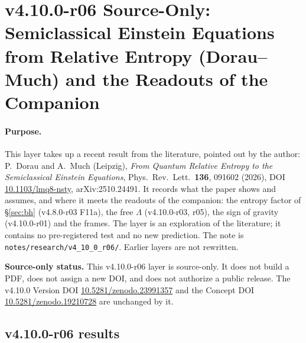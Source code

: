 \clearpage
\section*{v4.10.0-r06 Source-Only: Semiclassical Einstein Equations from Relative Entropy (Dorau--Much) and the Readouts of the Companion}
\label{sec:v4100-r06-relative-entropy}

\paragraph{Purpose.}
This layer takes up a recent result from the literature, pointed out by the author: P.~Dorau and A.~Much (Leipzig), \emph{From Quantum
Relative Entropy to the Semiclassical Einstein Equations}, Phys.\ Rev.\ Lett.\ \textbf{136}, 091602 (2026), DOI
\href{https://doi.org/10.1103/lmq8-nsty}{10.1103/lmq8-nsty}, arXiv:2510.24491.  It records what the paper shows and assumes, and where it meets the
readouts of the companion: the entropy factor of \S\ref{sec:bh} (v4.8.0-r03 F11a), the free \(\Lambda\) (v4.10.0-r03, r05), the sign of gravity
(v4.10.0-r01) and the frames.  The layer is an exploration of the literature; it contains no pre-registered test and no new prediction.
The note is \texttt{notes/\allowbreak research/\allowbreak v4\_10\_0\_r06/}.  Earlier layers are not rewritten.

\noindent\textbf{Source-only status.}
This v4.10.0-r06 layer is source-only.  It does not build a PDF, does not assign a new DOI,
and does not authorize a public release.  The v4.10.0 Version DOI
\href{https://doi.org/10.5281/zenodo.23991357}{10.5281/zenodo.23991357} and the Concept DOI
\href{https://doi.org/10.5281/zenodo.19210728}{10.5281/zenodo.19210728} are unchanged by it.

\subsection*{v4.10.0-r06 results}
\label{subsec:v4100-r06-results}

